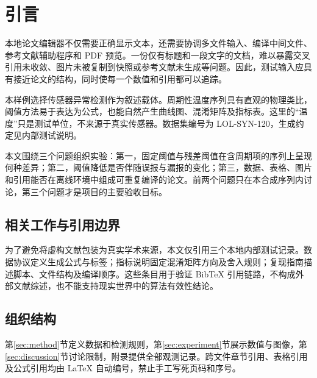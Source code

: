 \section{引言}
\label{sec:introduction}
本地论文编辑器不仅需要正确显示文本，还需要协调多文件输入、编译中间文件、参考文献辅助程序和 PDF 预览。一份仅有标题和一段文字的文档，难以暴露交叉引用未收敛、图片未被复制到快照或参考文献未生成等问题。因此，测试输入应具有接近论文的结构，同时使每一个数值和引用都可以追踪。

本样例选择传感器异常检测作为叙述载体。周期性温度序列具有直观的物理类比，阈值方法易于表达为公式，也能自然产生曲线图、混淆矩阵及指标表。这里的“温度”只是测试单位，不来源于真实传感器。数据集编号为 LOL-SYN-120，生成约定见内部测试说明\cite{lolData2026}。

本文围绕三个问题组织实验：第一，固定阈值与残差阈值在含周期项的序列上呈现何种差异；第二，阈值降低是否伴随误报与漏报的变化；第三，数据、表格、图片和引用能否在离线环境中组成可重复编译的论文。前两个问题只在本合成序列内讨论，第三个问题才是项目的主要验收目标。

\subsection{相关工作与引用边界}
为了避免将虚构文献包装为真实学术来源，本文仅引用三个本地内部测试记录。数据协议\cite{lolData2026}定义生成公式与标签；指标说明\cite{lolMetrics2026}固定混淆矩阵方向及舍入规则；复现指南\cite{lolReproduce2026}描述脚本、文件结构及编译顺序。这些条目用于验证 BibTeX 引用链路，不构成外部文献综述，也不能支持现实世界中的算法有效性结论。

\subsection{组织结构}
第\ref{sec:method}节定义数据和检测规则，第\ref{sec:experiment}节展示数值与图像，第\ref{sec:discussion}节讨论限制，附录提供全部观测记录。跨文件章节引用、表格引用及公式引用均由 LaTeX 自动编号，禁止手工写死页码和序号。
